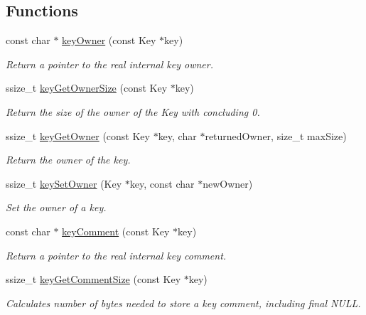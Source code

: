 \subsection*{Functions}
\begin{DoxyCompactItemize}
\item 
const char $\ast$ \hyperlink{group__meta_gaf6485fb8599714b6bbd830cf915ffea5}{key\+Owner} (const Key $\ast$key)
\begin{DoxyCompactList}\small\item\em Return a pointer to the real internal {\ttfamily key} owner. \end{DoxyCompactList}\item 
ssize\+\_\+t \hyperlink{group__meta_ga4a4561895741ba2ad10acf007c188593}{key\+Get\+Owner\+Size} (const Key $\ast$key)
\begin{DoxyCompactList}\small\item\em Return the size of the owner of the Key with concluding 0. \end{DoxyCompactList}\item 
ssize\+\_\+t \hyperlink{group__meta_ga35922a017bee8b4bcb493bbdfad9d6f5}{key\+Get\+Owner} (const Key $\ast$key, char $\ast$returned\+Owner, size\+\_\+t max\+Size)
\begin{DoxyCompactList}\small\item\em Return the owner of the key. \end{DoxyCompactList}\item 
ssize\+\_\+t \hyperlink{group__meta_ga88d6ec200ba0707b7c1b4a88133d2be4}{key\+Set\+Owner} (Key $\ast$key, const char $\ast$new\+Owner)
\begin{DoxyCompactList}\small\item\em Set the owner of a key. \end{DoxyCompactList}\item 
const char $\ast$ \hyperlink{group__meta_gac89fd319783b3457db45b4c09e55274a}{key\+Comment} (const Key $\ast$key)
\begin{DoxyCompactList}\small\item\em Return a pointer to the real internal {\ttfamily key} comment. \end{DoxyCompactList}\item 
ssize\+\_\+t \hyperlink{group__meta_ga0dd737fadc16d4cf16720d17f066a9d3}{key\+Get\+Comment\+Size} (const Key $\ast$key)
\begin{DoxyCompactList}\small\item\em Calculates number of bytes needed to store a key comment, including final N\+U\+L\+L. \end{DoxyCompactList}\item 

\end{DoxyCompactItemize}
